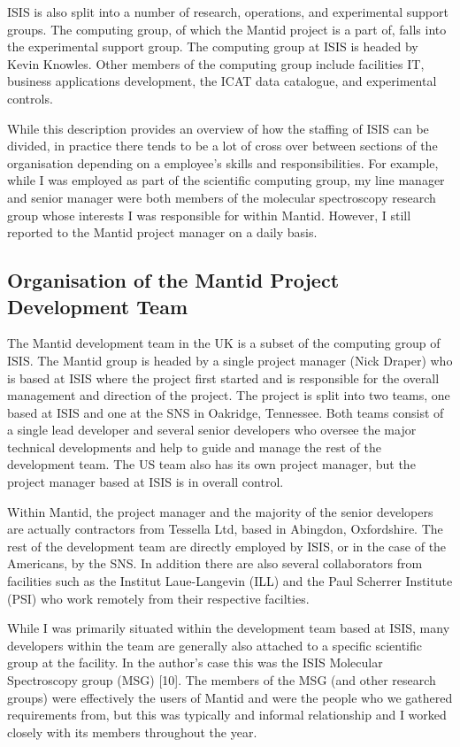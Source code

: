 \documentclass[paper=a4, fontsize=11pt]{scrartcl}	%
\numberwithin{equation}{section}															%
\numberwithin{figure}{section}																%
\numberwithin{table}{section}
\begin{document}
ISIS is also split into a number of research, operations, and
experimental support groups. The computing group, of which the Mantid
project is a part of, falls into the experimental support group. The
computing group at ISIS is headed by Kevin Knowles. Other members of the
computing group include facilities IT, business applications
development, the ICAT data catalogue, and experimental controls.

While this description provides an overview of how the staffing of ISIS
can be divided, in practice there tends to be a lot of cross over
between sections of the organisation depending on a employee's skills
and responsibilities. For example, while I was employed as part of the
scientific computing group, my line manager and senior manager were both
members of the molecular spectroscopy research group whose interests I
was responsible for within Mantid. However, I still reported to the
Mantid project manager on a daily basis.

\subsection{Organisation of the Mantid Project Development
Team}\label{organisation-of-the-mantid-project-development-team}

The Mantid development team in the UK is a subset of the computing group
of ISIS. The Mantid group is headed by a single project manager (Nick
Draper) who is based at ISIS where the project first started and is
responsible for the overall management and direction of the project. The
project is split into two teams, one based at ISIS and one at the SNS in
Oakridge, Tennessee. Both teams consist of a single lead developer and
several senior developers who oversee the major technical developments
and help to guide and manage the rest of the development team. The US
team also has its own project manager, but the project manager based at
ISIS is in overall control.

Within Mantid, the project manager and the majority of the senior
developers are actually contractors from Tessella Ltd, based in
Abingdon, Oxfordshire. The rest of the development team are directly
employed by ISIS, or in the case of the Americans, by the SNS. In
addition there are also several collaborators from facilities such as
the Institut Laue-Langevin (ILL) and the Paul Scherrer Institute (PSI)
who work remotely from their respective facilties.

While I was primarily situated within the development team based at
ISIS, many developers within the team are generally also attached to a
specific scientific group at the facility. In the author's case this was
the ISIS Molecular Spectroscopy group (MSG) {[}10{]}. The members of the
MSG (and other research groups) were effectively the users of Mantid and
were the people who we gathered requirements from, but this was
typically and informal relationship and I worked closely with its
members throughout the year.
\end{document}
